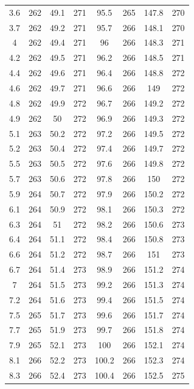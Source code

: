 \documentclass[12pt]{ctexart}
\numberwithin{equation}{section}
\begin{document}
\begin{longtable}{cc|cc|cc|cc}
3.6  &  262  &  49.1  &  271  &  95.5  &  265  &  147.8  &  270  \\
3.7  &  262  &  49.2  &  271  &  95.7  &  266  &  148.1  &  270  \\
4  &  262  &  49.4  &  271  &  96  &  266  &  148.3  &  271  \\
4.2  &  262  &  49.5  &  271  &  96.2  &  266  &  148.5  &  271  \\
4.4  &  262  &  49.6  &  271  &  96.4  &  266  &  148.8  &  272  \\
4.6  &  262  &  49.7  &  271  &  96.6  &  266  &  149  &  272  \\
4.8  &  262  &  49.9  &  272  &  96.7  &  266  &  149.2  &  272  \\
4.9  &  262  &  50  &  272  &  96.9  &  266  &  149.3  &  272  \\
5.1  &  263  &  50.2  &  272  &  97.2  &  266  &  149.5  &  272  \\
5.2  &  263  &  50.4  &  272  &  97.4  &  266  &  149.7  &  272  \\
5.5  &  263  &  50.5  &  272  &  97.6  &  266  &  149.8  &  272  \\
5.7  &  263  &  50.6  &  272  &  97.8  &  266  &  150  &  272  \\
5.9  &  264  &  50.7  &  272  &  97.9  &  266  &  150.2  &  272  \\
6.1  &  264  &  50.9  &  272  &  98.1  &  266  &  150.3  &  272  \\
6.3  &  264  &  51  &  272  &  98.2  &  266  &  150.6  &  273  \\
6.4  &  264  &  51.1  &  272  &  98.4  &  266  &  150.8  &  273  \\
6.6  &  264  &  51.2  &  272  &  98.7  &  266  &  151  &  273  \\
6.7  &  264  &  51.4  &  273  &  98.9  &  266  &  151.2  &  274  \\
7  &  264  &  51.5  &  273  &  99.2  &  266  &  151.3  &  274  \\
7.2  &  264  &  51.6  &  273  &  99.4  &  266  &  151.5  &  274  \\
7.5  &  265  &  51.7  &  273  &  99.6  &  266  &  151.7  &  274  \\
7.7  &  265  &  51.9  &  273  &  99.7  &  266  &  151.8  &  274  \\
7.9  &  265  &  52.1  &  273  &  100  &  266  &  152.1  &  274  \\
8.1  &  266  &  52.2  &  273  &  100.2  &  266  &  152.3  &  274  \\
8.3  &  266  &  52.4  &  273  &  100.4  &  266  &  152.5  &  275  \\

\end{longtable}
\end{document}
